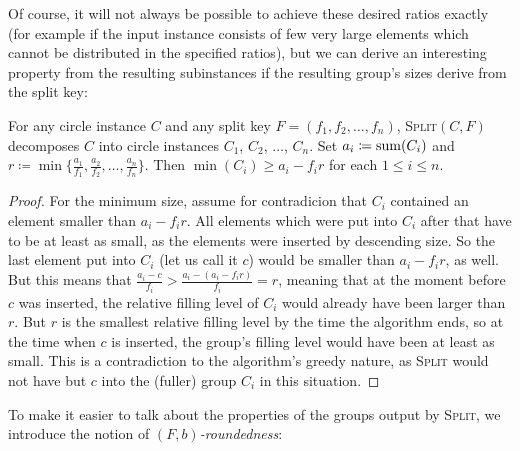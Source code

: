 Of course, it will not always be possible to achieve these desired ratios exactly (for example if the input instance consists of few very large elements which cannot be distributed in the specified ratios), but we can derive an interesting property from the resulting subinstances if the resulting group's sizes derive from the split key:

\begin{lemma}\label{th:split-property}
    For any circle instance $C$ and any split key $F = (f_1, f_2, \dots, f_n)$, \textsc{Split}$(C,F)$ decomposes $C$ into circle instances $C_1$, $C_2$, $\dots$, $C_n$.
    Set $a_i \coloneqq \operatorname{sum}(C_i)$ and $r \coloneqq \min\{\frac{a_1}{f_1}, \frac{a_2}{f_2}, \dots, \frac{a_n}{f_n}\}$.
    Then $\min(C_i) \ge a_i - f_i r$ for each $1 \le i \le n$.
\end{lemma}

\begin{proof}
    For the minimum size, assume for contradicion that $C_i$ contained an element smaller than $a_i - f_i r$. All elements which were put into $C_i$ after that have to be at least as small, as the elements were inserted by descending size. So the last element put into $C_i$ (let us call it $c$) would be smaller than $a_i - f_i r$, as well.
    But this means that $\frac{a_i - c}{f_i} > \frac{a_i - (a_i - f_i r)}{f_i} = r$, meaning that at the moment before $c$ was inserted, the relative filling level of $C_i$ would already have been larger than $r$. But $r$ is the smallest relative filling level by the time the algorithm ends, so at the time when $c$ is inserted, the group's filling level would have been at least as small.
    This is a contradiction to the algorithm's greedy nature, as \textsc{Split} would not have but $c$ into the (fuller) group $C_i$ in this situation.
\end{proof}

To make it easier to talk about the properties of the groups output by \textsc{Split}, we introduce the notion of \emph{$(F,b)$-roundedness}:


